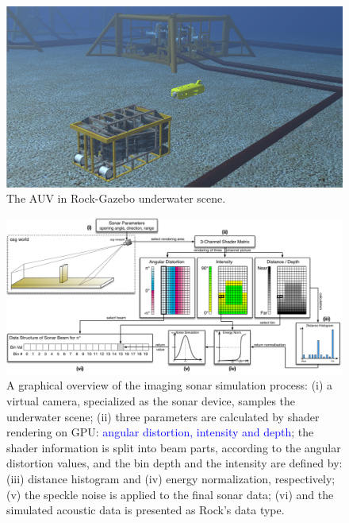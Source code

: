 \documentclass[final,5p,times]{elsarticle}
\begin{document}
\begin{figure}[t]
    \includegraphics[width=\columnwidth]{figs/uwscene}
    \centering
    \captionsetup{justification=justified}
    \caption{The AUV in Rock-Gazebo underwater scene.}
    \label{fig:uwscene}
\end{figure}


\begin{figure}[t]
    \includegraphics[width=0.85\paperwidth]{figs/sonar_sim}
    \centering
    \captionsetup{justification=justified}
    \caption{A graphical overview of the imaging sonar simulation process: (i) a virtual camera, specialized as the sonar device, samples the underwater scene; (ii) three parameters are calculated by shader rendering on GPU: \textcolor{blue}{angular distortion, intensity and depth}; the shader information is split into beam parts, according to the angular distortion values, and the bin depth and the intensity are defined by: (iii) distance histogram and (iv) energy normalization, respectively; (v) the speckle noise is applied to the final sonar data; (vi) and the simulated acoustic data is presented as Rock's data type.}
    \label{fig:sonar_sim}
\end{figure}
\end{document}
